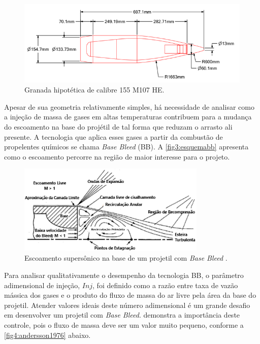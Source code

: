 \begin{figure}[!ht]
	\centering
	\includegraphics[width=1.0\textwidth]{foto02-cad-155mm.png}
	\caption[Granada hipotética de calibre \qty{155}{\millimetre} M107 HE.]{Granada hipotética de calibre \qty{155}{\millimetre} M107 HE.}
	\label{fig2:cad-155mm}
\end{figure}

Apesar de sua geometria relativamente simples, há necessidade de analisar como a injeção de massa de gases em altas temperaturas contribuem para a mudança do escoamento na base do projétil de tal forma que reduzam o arrasto ali presente. A tecnologia que aplica esses gases a partir da combustão de propelentes químicos se chama \textit{Base Bleed} (BB). A \autoref{fig3:esquemabb} apresenta como o escoamento percorre na região de maior interesse para o projeto.

\begin{figure}[!ht]
	\centering
	\includegraphics[width=0.8\textwidth]{foto03-esquema-bb.png}
	\caption[Escoamento supersônico na base de um projetil com \textit{Base Bleed}.]{Escoamento supersônico na base de um projetil com \textit{Base Bleed} \cite{Mathur&Dutton1996}.}
	\label{fig3:esquemabb}
\end{figure}

Para analisar qualitativamente o desempenho da tecnologia BB, o parâmetro adimensional de injeção, \(Inj\), foi definido como a razão entre taxa de vazão mássica dos gases e o produto do fluxo de massa do ar livre pela área da base do projetil. Atender valores ideais deste número adimensional é um grande desafio em desenvolver um projetil com \textit{Base Bleed}. \citeauthor{Andersson1976} demonstra a importância deste controle, pois o fluxo de massa deve ser um valor muito pequeno, conforme a \autoref{fig4:andersson1976} abaixo.

